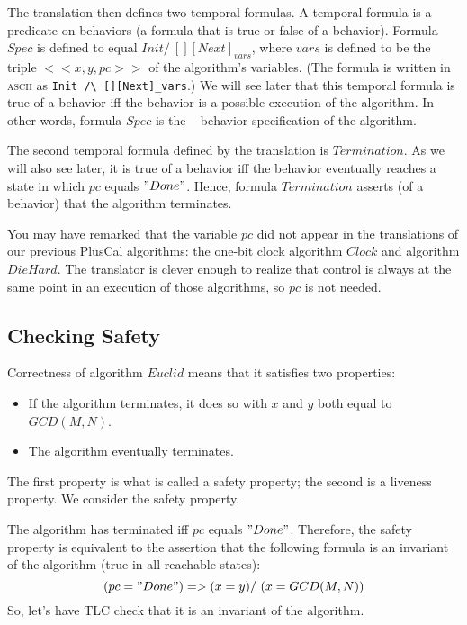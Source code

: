 The translation then defines two temporal formulas.  A temporal
formula is a predicate on behaviors (a formula that is true or false
of a behavior).  Formula $Spec$ is defined to equal
  $Init /\ [][Next]_{vars}$, where
$vars$ is defined to be the triple $<<x, y, pc>>$ of the algorithm's
variables.  
(The formula is written in \textsc{ascii} as \verb|Init /\ [][Next]_vars|.)
We will see later that this temporal formula is true of a
behavior iff the behavior is a possible execution of the algorithm.
In other words, formula $Spec$ is the \tlaplus\ 
behavior specification of the algorithm.

The second temporal formula defined by the translation is
$Termination$.  As we will also see later, it is true of a behavior
iff the behavior eventually reaches a state in which $pc$ equals
$"Done"$.  Hence, formula $Termination$ asserts (of a behavior) that
the algorithm terminates.

\pause

\noindent
You may have remarked that the variable $pc$ did not appear in the
translations of our previous PlusCal algorithms: the one-bit clock
algorithm $Clock$ and algorithm $DieHard$.  The translator is clever
enough to realize that control is always at the same point in an 
execution of those algorithms, so $pc$ is not needed.

\subsection{Checking Safety}

Correctness of algorithm $Euclid$ means that it satisfies two
properties:
\begin{itemize}
\item If the algorithm terminates, it does so with $x$ and $y$ both equal
to $GCD(M,N)$.

\item The algorithm eventually terminates.
\end{itemize}
The first property is what is called a
safety property; 
the second is a
liveness property.  We consider the safety property.

The algorithm has terminated iff $pc$ equals $"Done"$.  Therefore, the
safety property is equivalent to the assertion that the following
formula is an invariant of the algorithm (true in all reachable states):
  \[  (pc = "Done") => (x = y) /\ (x = GCD(M, N))
  \]
So, let's have TLC check that it is an invariant of the algorithm.

